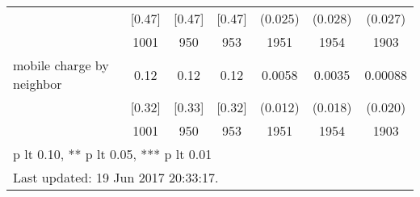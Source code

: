 \begin{table}[htbp]
\begin{tabular*}{1\hsize}{@{\hskip\tabcolsep\extracolsep\fill}l*{1}{cccccc}}
                                &   [0.47]&   [0.47]&   [0.47]&  (0.025)         &  (0.028)         &  (0.027)         \\
                                &     1001&      950&      953&     1951         &     1954         &     1903         \\
mobile charge by neighbor       &     0.12&     0.12&     0.12&   0.0058         &   0.0035         &  0.00088         \\
                                &   [0.32]&   [0.33]&   [0.32]&  (0.012)         &  (0.018)         &  (0.020)         \\
                                &     1001&      950&      953&     1951         &     1954         &     1903         \\
\bottomrule
\multicolumn{7}{l}{\footnotesize * p lt 0.10, ** p lt 0.05, *** p lt 0.01}\\
\multicolumn{7}{l}{\footnotesize Last updated: 19 Jun 2017 20:33:17.}\\
\end{tabular*}
\end{table}
